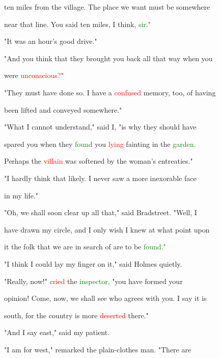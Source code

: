  ten miles from the village. The place we want must be somewhere

 near that line. You said ten miles, I think, \textcolor{green}{sir."}



 "It was an hour's \textcolor{BurntOrange}{good} drive."



 "And you think that they brought you back all that way when you

 were \textcolor{red}{unconscious?"}



 "They must have done so. I have a \textcolor{red}{confused} memory, too, of having

 been lifted and conveyed somewhere."



 "What I cannot understand," said I, "is why they should have

 spared you when they \textcolor{green}{found} you \textcolor{red}{lying} \textcolor{BurntOrange}{fainting} in the \textcolor{green}{garden.}

 Perhaps the \textcolor{red}{villain} was softened by the woman's entreaties."



 "I hardly think that likely. I never saw a more inexorable face

 in my life."



 "Oh, we shall soon clear up all that," said Bradstreet. "Well, I

 have drawn my circle, and I only wish I knew at what point upon

 it the folk that we are in search of are to be \textcolor{green}{found."}



 "I think I could lay my finger on it," said Holmes quietly.



 "Really, now!" \textcolor{red}{cried} the \textcolor{green}{inspector,} "you have formed your

 opinion! Come, now, we shall see who agrees with you. I say it is

 south, for the country is more \textcolor{red}{deserted} there."



 "And I say east," said my \textcolor{BurntOrange}{patient.}



 "I am for west," remarked the plain-clothes man. "There are


